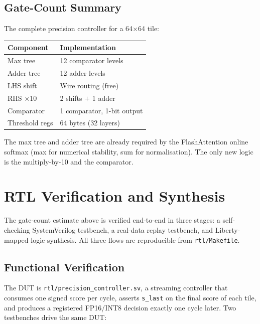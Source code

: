 \documentclass[10pt,twocolumn]{article}
\begin{document}
\subsection{Gate-Count Summary}

The complete precision controller for a 64$\times$64 tile:

\begin{center}
\small
\setlength{\tabcolsep}{4pt}
\begin{tabular}{ll}
\toprule
Component & Implementation \\
\midrule
Max tree & 12 comparator levels \\
Adder tree & 12 adder levels \\
LHS shift & Wire routing (free) \\
RHS $\times$10 & 2 shifts $+$ 1 adder \\
Comparator & 1 comparator, 1-bit output \\
Threshold regs & 64 bytes (32 layers) \\
\bottomrule
\end{tabular}
\end{center}

The max tree and adder tree are already required by the FlashAttention
online softmax (max for numerical stability, sum for normalisation).
The only new logic is the multiply-by-10 and the comparator.

\section{RTL Verification and Synthesis}
\label{sec:rtl}

The gate-count estimate above is verified end-to-end in three stages: a
self-checking SystemVerilog testbench, a real-data replay testbench, and
Liberty-mapped logic synthesis. All three flows are reproducible from
\texttt{rtl/Makefile}.

\subsection{Functional Verification}

The DUT is \texttt{rtl/precision\_controller.sv}, a streaming controller
that consumes one signed score per cycle, asserts \texttt{s\_last} on the
final score of each tile, and produces a registered FP16/INT8 decision
exactly one cycle later. Two testbenches drive the same DUT:
\end{document}
